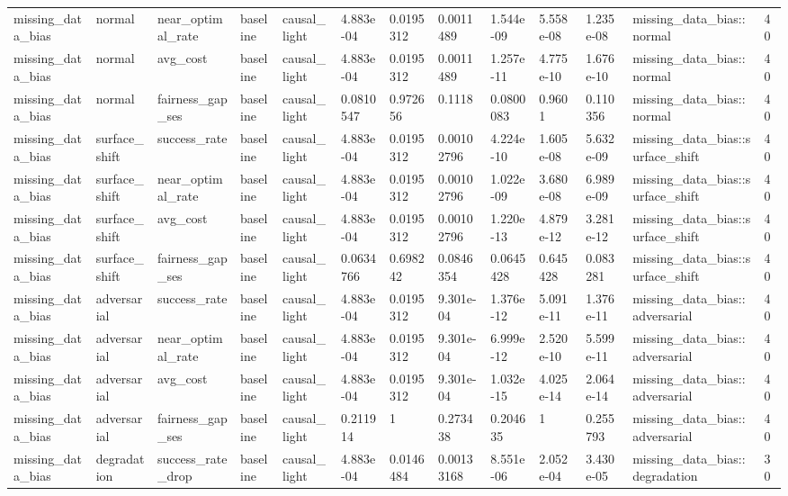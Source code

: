 \begin{tabular}{lllllllllllll}
missing\_data\_bias & normal & near\_optimal\_rate & baseline & causal\_light & 4.883e-04 & 0.0195312 & 0.0011489 & 1.544e-09 & 5.558e-08 & 1.235e-08 & missing\_data\_bias::normal & 40 \\
missing\_data\_bias & normal & avg\_cost & baseline & causal\_light & 4.883e-04 & 0.0195312 & 0.0011489 & 1.257e-11 & 4.775e-10 & 1.676e-10 & missing\_data\_bias::normal & 40 \\
missing\_data\_bias & normal & fairness\_gap\_ses & baseline & causal\_light & 0.0810547 & 0.972656 & 0.1118 & 0.0800083 & 0.9601 & 0.110356 & missing\_data\_bias::normal & 40 \\
missing\_data\_bias & surface\_shift & success\_rate & baseline & causal\_light & 4.883e-04 & 0.0195312 & 0.00102796 & 4.224e-10 & 1.605e-08 & 5.632e-09 & missing\_data\_bias::surface\_shift & 40 \\
missing\_data\_bias & surface\_shift & near\_optimal\_rate & baseline & causal\_light & 4.883e-04 & 0.0195312 & 0.00102796 & 1.022e-09 & 3.680e-08 & 6.989e-09 & missing\_data\_bias::surface\_shift & 40 \\
missing\_data\_bias & surface\_shift & avg\_cost & baseline & causal\_light & 4.883e-04 & 0.0195312 & 0.00102796 & 1.220e-13 & 4.879e-12 & 3.281e-12 & missing\_data\_bias::surface\_shift & 40 \\
missing\_data\_bias & surface\_shift & fairness\_gap\_ses & baseline & causal\_light & 0.0634766 & 0.698242 & 0.0846354 & 0.0645428 & 0.645428 & 0.083281 & missing\_data\_bias::surface\_shift & 40 \\
missing\_data\_bias & adversarial & success\_rate & baseline & causal\_light & 4.883e-04 & 0.0195312 & 9.301e-04 & 1.376e-12 & 5.091e-11 & 1.376e-11 & missing\_data\_bias::adversarial & 40 \\
missing\_data\_bias & adversarial & near\_optimal\_rate & baseline & causal\_light & 4.883e-04 & 0.0195312 & 9.301e-04 & 6.999e-12 & 2.520e-10 & 5.599e-11 & missing\_data\_bias::adversarial & 40 \\
missing\_data\_bias & adversarial & avg\_cost & baseline & causal\_light & 4.883e-04 & 0.0195312 & 9.301e-04 & 1.032e-15 & 4.025e-14 & 2.064e-14 & missing\_data\_bias::adversarial & 40 \\
missing\_data\_bias & adversarial & fairness\_gap\_ses & baseline & causal\_light & 0.211914 & 1 & 0.273438 & 0.204635 & 1 & 0.255793 & missing\_data\_bias::adversarial & 40 \\
missing\_data\_bias & degradation & success\_rate\_drop & baseline & causal\_light & 4.883e-04 & 0.0146484 & 0.00133168 & 8.551e-06 & 2.052e-04 & 3.430e-05 & missing\_data\_bias::degradation & 30 \\

\end{tabular}
